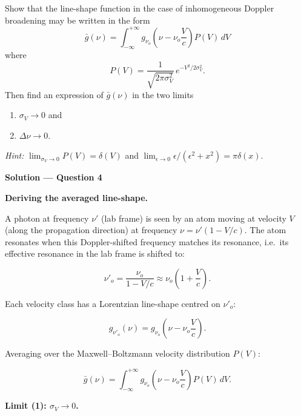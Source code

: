 \begin{question}[Question 4]Show that the line-shape function in the case of inhomogeneous Doppler
broadening may be written in the form
\begin{equation*}
  \bar{g}(\nu)=\int_{-\infty}^{+\infty}g_{\nu_{o}}\!\left(\nu-\nu_{o}\frac{V}{c}\right)P(V)\,dV
\end{equation*}
where
\begin{equation*}
  P(V)=\frac{1}{\sqrt{2\pi\sigma_{V}^{2}}}\,e^{-V^{2}/2\sigma_{V}^{2}}.
\end{equation*}
Then find an expression of $\bar{g}(\nu)$ in the two limits
\begin{enumerate}[label=(\arabic*)]
  \item $\sigma_{V}\to 0$ and
  \item $\Delta\nu\to 0$.
\end{enumerate}
\emph{Hint:} $\lim_{\sigma_{V}\to 0}P(V)=\delta(V)$ and
$\lim_{\epsilon\to 0}\epsilon/(\epsilon^{2}+x^{2})=\pi\delta(x)$.
\end{question}

\textbf{\large Solution --- Question 4}

\textbf{Deriving the averaged line-shape.}

A photon at frequency $\nu'$ (lab frame) is seen by an atom moving at velocity $V$ (along the propagation direction) at frequency $\nu = \nu'(1 - V/c)$. The atom resonates when this Doppler-shifted frequency matches its resonance, i.e.\ its effective resonance in the lab frame is shifted to:

\begin{equation*}
  \nu'_o = \frac{\nu_o}{1 - V/c} \approx \nu_o\!\left(1 + \frac{V}{c}\right).
\end{equation*}

Each velocity class has a Lorentzian line-shape centred on $\nu'_o$:

\begin{equation*}
  g_{\nu'_o}(\nu) = g_{\nu_o}\!\left(\nu - \nu_o\frac{V}{c}\right).
\end{equation*}

Averaging over the Maxwell--Boltzmann velocity distribution $P(V)$:

\begin{equation*}
  \boxed{\bar{g}(\nu) = \int_{-\infty}^{+\infty} g_{\nu_o}\!\left(\nu - \nu_o\frac{V}{c}\right) P(V)\,dV.}
\end{equation*}

\textbf{Limit (1): $\sigma_V \to 0$.}

